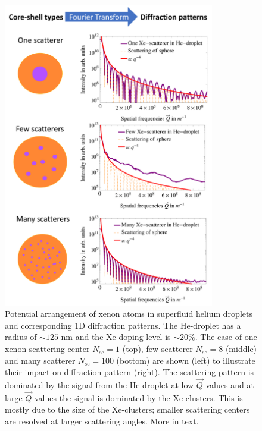 \begin{figure}
 	\centering
 		\includegraphics[width=0.82\textwidth]{images/results/plum-pudding.png}
 	\caption[Potential arrangement of Xe-cluster within He-droplets.]{Potential arrangement of xenon atoms in superfluid helium droplets and corresponding 1D diffraction patterns. The He-droplet has a radius of $\sim 125$ nm and the Xe-doping level is $\sim 20\%$. The case of one xenon scattering center $N_{\text{sc}}=1$ (top), few scatterer $N_{\text{sc}}=8$ (middle) and many scatterer $N_{\text{sc}}=100$ (bottom) are shown (left) to illustrate their impact on diffraction pattern (right). The scattering pattern is dominated by the signal from the He-droplet at low $\vec{Q}$-values and at large $\vec{Q}$-values the signal is dominated by the Xe-clusters. This is mostly due to the size of the Xe-clusters; smaller scattering centers are resolved at larger scattering angles. More in text.}
 	\label{fig:HeXe-plum-pudding}
\end{figure}

